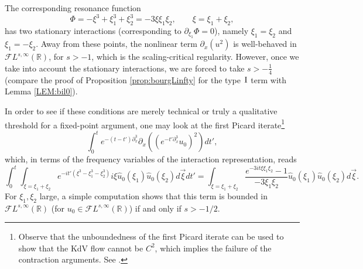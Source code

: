 \documentclass[%
11pt,  reqno]{amsart}
\newcommand{\I}{\hspace{0.2mm}\textup{I}\hspace{0.2mm}}
\newcommand{\5}{\textup{V}}
\newcommand{\FL}{\mathcal{F} L}
\DeclareMathOperator*{\intt}{\int}
\newcommand{\dx}{\partial_x}
\theoremstyle{remark}
\newcommand{\R}{\mathbb{R}}
\numberwithin{equation}{section}
\numberwithin{theorem}{section}
\begin{document}
	The corresponding resonance function
	\begin{equation}
		\Phi=-\xi^3+\xi_1^3+\xi_2^3 = -3\xi\xi_1\xi_2, \qquad \xi=\xi_1+\xi_2,
	\end{equation}
	has two stationary interactions (corresponding to $\partial_{\xi_1}\Phi=0$), namely $\xi_1=\xi_2$ and $\xi_1=-\xi_2$. Away from these points, the nonlinear term $\partial_x(u^2)$ is well-behaved in $\FL^{s,\infty}(\R)$,
	for $s>-1$, which is the scaling-critical regularity. 
However, once we take into account the stationary interactions, we are forced to take $s>-\frac14$ (compare the proof of Proposition \ref{prop:bourgLinfty} for the type $\I$ term with Lemma \ref{LEM:bil0}).
    
	
	\medskip
	In order to see if these conditions are merely technical or truly a qualitative threshold for a fixed-point argument, one may look at the first Picard iterate\footnote{Observe that the unboundedness of the first Picard iterate can be used to show that the KdV flow cannot be $C^2$, which implies the failure of the contraction arguments. See  \cite{bou_ill_kdv, MolTzeSaut_ill, Tzvetkov_ill}.}
	$$
	\int_0^t e^{-(t-t')\dx^3}\partial_x((e^{-t'\dx^3}u_0)^2)dt',
	$$
	which, in terms of the frequency variables of the interaction representation, reads
	\begin{equation}\label{eq:first_picard}
		\int_0^t \intt_{\xi=\xi_1+\xi_2}e^{-it' (\xi^3 -
			\xi_1^3 - \xi_2^3) } i\xi \widehat{u}_0( \xi_1) \widehat{u}_0(\xi_2) d\vec{\xi} dt' = \intt_{\xi=\xi_1+\xi_2}\frac{e^{-3it\xi\xi_1\xi_2}-1}{-3\xi_1\xi_2} \widehat{u}_0( \xi_1) \widehat{u}_0(\xi_2) d\vec{\xi}.
	\end{equation}
	For $\xi_1, \xi_2$ large, 
	a simple computation shows that this term is bounded in $\mathcal{F}L^{s,\infty}(\R)$ (for $u_0\in \mathcal{F}L^{s,\infty}(\R)$) if and only if $s>-1/2$.
	
\end{document}
